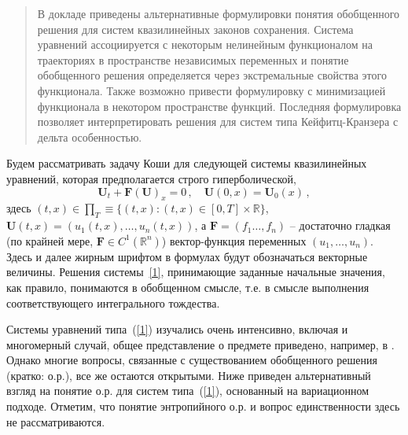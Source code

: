 
\maketitle

\begin{abstract}
В докладе приведены альтернативные формулировки понятия обобщенного
решения для систем квазилинейных законов сохранения. Система
уравнений ассоциируется с некоторым нелинейным функционалом на
траекториях в пространстве независимых переменных и понятие
обобщенного решения определяется через экстремальные свойства этого
функционала. Также возможно привести формулировку с минимизацией
функционала в некотором пространстве функций. Последняя
формулировка позволяет интерпретировать решения для систем типа
Кейфитц-Кранзера с дельта особенностью.


\end{abstract}


Будем рассматривать задачу Коши для следующей системы квазилинейных
уравнений, которая предполагается строго гиперболической,
\begin{equation}\label{1}
\mathbf{U}_{t}+\mathbf{F}(\mathbf{U})_{x}=0\,,\quad\mathbf{U}(0,x)=\mathbf{U}_{0}(x)\,,
\end{equation}
здесь
$(t,x)\in\prod_{T}\equiv\{(t,x):(t,x)\in[0,T]\times\mathbb{R}\}$,
$\mathbf{U}(t,x)=(u_{1}(t,x),\ldots,u_{n}(t,x))$, а
$\mathbf{F}=(f_{1}\ldots,f_{n})$ -- достаточно гладкая (по крайней
мере, $\mathbf{F}\in C^{1}(\mathbb{R}^{n})$) вектор-функция
переменных $(u_{1},\ldots,u_{n})$. Здесь и далее жирным шрифтом в
формулах будут обозначаться векторные величины. Решения
системы~\ref{1}, принимающие заданные начальные значения, как
правило, понимаются в обобщенном смысле, т.е. в смысле выполнения
соответствующего интегрального тождества.

Системы уравнений типа~(\ref{1}) изучались очень интенсивно,
включая и многомерный случай, общее представление о предмете
приведено, например, в \cite{LTP}. Однако многие вопросы, связанные
с существованием обобщенного решения (кратко: о.р.), все же
остаются открытыми. Ниже приведен альтернативный взгляд на понятие
о.р. для систем типа~(\ref{1}), основанный на вариационном подходе.
Отметим, что понятие энтропийного о.р. и вопрос единственности
здесь не рассматриваются.

